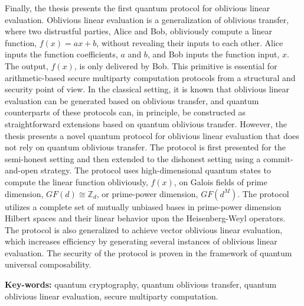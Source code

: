 Finally, the thesis presents the first quantum protocol for oblivious linear evaluation. Oblivious linear evaluation is a generalization of oblivious transfer, where two distrustful parties, Alice and Bob, obliviously compute a linear function, $f(x) = ax + b$, without revealing their inputs to each other. Alice inputs the function coefficients, $a$ and $b$, and Bob inputs the function input, $x$. The output, $f(x)$, is only delivered by Bob. This primitive is essential for arithmetic-based secure multiparty computation protocols from a structural and security point of view. In the classical setting, it is known that oblivious linear evaluation can be generated based on oblivious transfer, and quantum counterparts of these protocols can, in principle, be constructed as straightforward extensions based on quantum oblivious transfer. However, the thesis presents a novel quantum protocol for oblivious linear evaluation that does not rely on quantum oblivious transfer. The protocol is first presented for the semi-honest setting and then extended to the dishonest setting using a commit-and-open strategy. The protocol uses high-dimensional quantum states to compute the linear function obliviously, $f(x)$, on Galois fields of prime dimension, $GF(d) \cong \mathbb{Z}_d$, or prime-power dimension, $GF(d^M)$. The protocol utilizes a complete set of mutually unbiased bases in prime-power dimension Hilbert spaces and their linear behavior upon the Heisenberg-Weyl operators. The protocol is also generalized to achieve vector oblivious linear evaluation, which increases efficiency by generating several instances of oblivious linear evaluation. The security of the protocol is proven in the framework of quantum universal composability.

\vfill

\begin{flushleft}
\textbf{Key-words:} quantum cryptography, quantum oblivious transfer, quantum oblivious linear evaluation, secure multiparty computation.
\end{flushleft}
